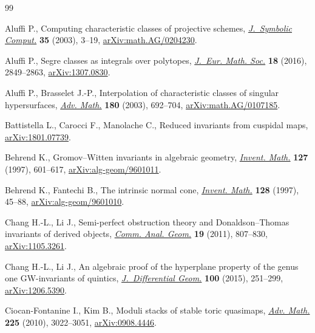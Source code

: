 \documentclass[pdftex]{sigma}
\numberwithin{equation}{section}
\begin{document}
\begin{thebibliography}{99}
\footnotesize\itemsep=0pt

Aluffi P., Computing characteristic classes of projective schemes,
 \href{https://doi.org/10.1016/S0747-7171(02)00089-5}{\textit{J.~Symbolic Comput.}} \textbf{35} (2003), 3--19,
 \href{https://arxiv.org/abs/math.AG/0204230}{arXiv:math.AG/0204230}.

Aluffi P., Segre classes as integrals over polytopes, \href{https://doi.org/10.4171/JEMS/655}{\textit{J.~Eur. Math.
 Soc.}} \textbf{18} (2016), 2849--2863, \href{https://arxiv.org/abs/1307.0830}{arXiv:1307.0830}.

Aluffi P., Brasselet J.-P., Interpolation of characteristic classes of singular
 hypersurfaces, \href{https://doi.org/10.1016/S0001-8708(03)00017-3}{\textit{Adv. Math.}} \textbf{180} (2003), 692--704, \href{https://arxiv.org/abs/math.AG/0107185}{arXiv:math.AG/0107185}.

Battistella L., Carocci F., Manolache C., Reduced invariants from cuspidal
 maps, \href{https://arxiv.org/abs/1801.07739}{arXiv:1801.07739}.

Behrend K., Gromov--{W}itten invariants in algebraic geometry, \href{https://doi.org/10.1007/s002220050132}{\textit{Invent.
 Math.}} \textbf{127} (1997), 601--617, \href{https://arxiv.org/abs/alg-geom/9601011}{arXiv:alg-geom/9601011}.

Behrend K., Fantechi B., The intrinsic normal cone, \href{https://doi.org/10.1007/s002220050136}{\textit{Invent. Math.}}
 \textbf{128} (1997), 45--88, \href{https://arxiv.org/abs/alg-geom/9601010}{arXiv:alg-geom/9601010}.

Chang H.-L., Li J., Semi-perfect obstruction theory and {D}onaldson--{T}homas
 invariants of derived objects, \href{https://doi.org/10.4310/CAG.2011.v19.n4.a6}{\textit{Comm. Anal. Geom.}} \textbf{19} (2011),
 807--830, \href{https://arxiv.org/abs/1105.3261}{arXiv:1105.3261}.

Chang H.-L., Li J., An algebraic proof of the hyperplane property of the genus
 one {GW}-invariants of quintics, \href{https://doi.org/10.4310/jdg/1430744122}{\textit{J.~Differential Geom.}} \textbf{100}
 (2015), 251--299, \href{https://arxiv.org/abs/1206.5390}{arXiv:1206.5390}.

Ciocan-Fontanine I., Kim B., Moduli stacks of stable toric quasimaps,
 \href{https://doi.org/10.1016/j.aim.2010.05.023}{\textit{Adv. Math.}} \textbf{225} (2010), 3022--3051, \href{https://arxiv.org/abs/0908.4446}{arXiv:0908.4446}.


\end{thebibliography}
\end{document}
